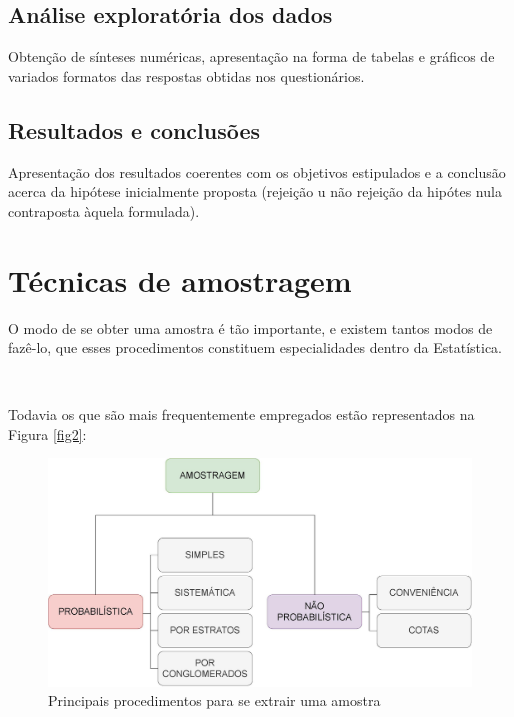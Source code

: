 \documentclass[
]{book}
\begin{document}
\hypertarget{anuxe1lise-exploratuxf3ria-dos-dados}{%
\subsection{Análise exploratória dos dados}\label{anuxe1lise-exploratuxf3ria-dos-dados}}

Obtenção de sínteses numéricas, apresentação na forma de tabelas e gráficos de variados formatos das respostas obtidas nos questionários.

\hypertarget{resultados-e-conclusuxf5es}{%
\subsection{Resultados e conclusões}\label{resultados-e-conclusuxf5es}}

Apresentação dos resultados coerentes com os objetivos estipulados e a conclusão acerca da hipótese inicialmente proposta (rejeição u não rejeição da hipótes nula contraposta àquela formulada).

\hypertarget{tuxe9cnicas-de-amostragem}{%
\section{Técnicas de amostragem}\label{tuxe9cnicas-de-amostragem}}

\hfill\break

O modo de se obter uma amostra é tão importante, e existem tantos modos de fazê-lo, que esses procedimentos constituem especialidades dentro da Estatística.

~

Todavia os que são mais frequentemente empregados estão representados na Figura \ref{fig2}:

\hfill\break

\begin{figure}

{\centering \includegraphics[width=0.8\linewidth]{images7/amostragem} 

}

\caption{Principais procedimentos para se extrair uma amostra}\label{fig:fig02}
\end{figure}
\end{document}
